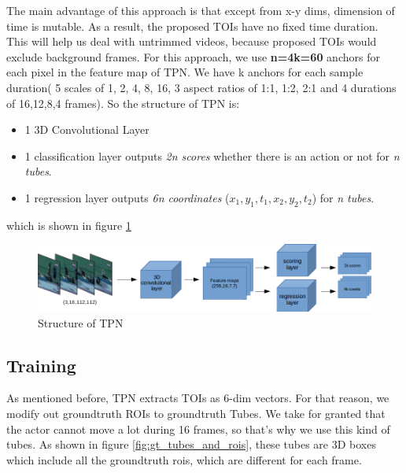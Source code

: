 \documentclass{report}
\begin{document}
The main advantage of this approach is that except from x-y dims, dimension of time is mutable. As a result, the proposed TOIs have
no fixed time duration. This will help us deal with untrimmed videos, because proposed TOIs would exclude background frames.
For this approach, we use \textbf{n=4k=60} anchors for each pixel in the feature map of TPN. We have k anchors for each sample
duration( 5 scales of 1, 2, 4, 8, 16, 3 aspect ratios of 1:1, 1:2, 2:1 and 4 durations of 16,12,8,4 frames). So the structure of TPN is:
\begin{itemize}
\item 1 3D Convolutional Layer
\item 1 classification layer outputs \textit{2n scores} whether there is an action or not for \textit{n tubes}.
\item 1 regression layer outputs \textit{6n coordinates} ($x_1,y_1,t_1,x_2,y_2,t_2$) for \textit{n tubes}.
\end{itemize}

which is shown in figure \ref{fig:tpn_1_1}
\begin{figure}[h]

  \includegraphics[width=1.\textwidth]{tpn_1_1}
  \caption{Structure of TPN}
  \label{fig:tpn_1_1}
\end{figure}

\subsection{Training}
As mentioned before, TPN extracts TOIs as 6-dim vectors. For that reason, we modify out groundtruth ROIs to groundtruth Tubes.
We take for granted that the actor cannot move a lot during 16 frames, so that's why we use this kind of tubes. As shown 
in figure \ref{fig:gt_tubes_and_rois}, these tubes are 3D boxes which include all the groundtruth rois, which are different
for each frame.
\end{document}
